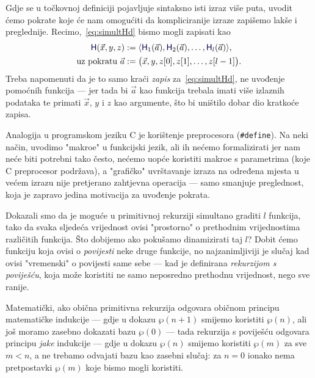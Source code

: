 \begin{napomena}[{name=[pokrate u točkovnim definicijama]}]
Gdje se u točkovnoj definiciji pojavljuje sintaksno isti izraz više puta, uvodit ćemo pokrate koje će nam omogućiti da kompliciranije izraze zapišemo lakše i preglednije. Recimo,~\eqref{eq:simultHd} bismo mogli zapisati kao
\begin{align*}
    \f H(\vec x,y,z)&:=\langle \f H_1(\vec a),\f H_2(\vec a),\dotsc,\f H_l(\vec a)\rangle\text,\\
    \text{uz pokratu } \vec a&:=\bigl(\vec x,y,z[0],z[1],\dotsc,z[l-1]\bigr)\text.
\end{align*}
Treba napomenuti da je to samo kraći \emph{zapis} za~\eqref{eq:simultHd}, ne uvođenje pomoćnih funkcija --- jer tada bi $\vec a$ kao funkcija trebala imati više izlaznih podataka te primati $\vec x$, $y$ i $z$ kao argumente, što bi uništilo dobar dio kratkoće zapisa.

Analogija u programskom jeziku C je korištenje preprocesora (\verb+#define+). Na neki način, uvodimo "makroe" u funkcijski jezik, ali ih nećemo formalizirati jer nam neće biti potrebni tako često, nećemo uopće koristiti makroe s parametrima (koje C preprocesor podržava), a "grafičko" uvrštavanje izraza na određena mjesta u većem izrazu nije pretjerano zahtjevna operacija --- samo smanjuje preglednost, koja je zapravo jedina motivacija za uvođenje pokrata.
\end{napomena}

Dokazali smo da je moguće u primitivnoj rekurziji simultano graditi $l$ funkcija, tako da svaka sljedeća vrijednost ovisi "prostorno" o prethodnim vrijednostima različitih funkcija. Što dobijemo ako pokušamo dinamizirati taj $l$? Dobit ćemo funkciju koja ovisi o \emph{povijesti} neke druge funkcije, no najzanimljiviji je slučaj kad ovisi "vremenski" o povijesti same sebe --- kad je definirana \emph{rekurzijom s poviješću}, koja može koristiti ne samo neposredno prethodnu vrijednost, nego sve ranije.

Matematički, ako obična primitivna rekurzija odgovara običnom principu matematičke indukcije --- gdje u dokazu $\wp(n+1)$ smijemo koristiti $\wp(n)$, ali još moramo zasebno dokazati bazu $\wp(0)$ --- tada rekurzija s poviješću odgovara principu \emph{jake} indukcije --- gdje u dokazu $\wp(n)$ smijemo koristiti $\wp(m)$ za sve $m<n$, a ne trebamo odvajati bazu kao zasebni slučaj: za $n=0$ ionako nema pretpostavki $\wp(m)$ koje bismo mogli koristiti.

